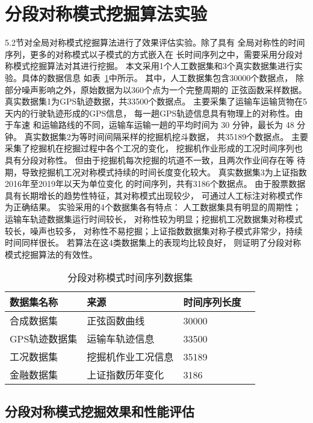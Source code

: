 \section{分段对称模式挖掘算法实验}

5.2节对全局对称模式挖掘算法进行了效果评估实验。除了具有
全局对称性的时间序列，更多的对称模式以子模式的方式嵌入在
长时间序列之中，需要采用分段对称模式挖掘算法对其进行挖掘。
本文采用1个人工数据集和3个真实数据集进行实验。具体的数据信息
如表~\ref{tab:segment_dataset}中所示。
其中，人工数据集包含30000个数据点，
除部分噪声影响之外，原始数据为以360个点为一个完整周期的
正弦函数采样数据。
真实数据集1为GPS轨迹数据，共33500个数据点。
主要采集了运输车运输货物在5天内的行驶轨迹形成的GPS信息，
每一趟GPS轨迹信息具有物理上的对称性。由于车速
和运输路线的不同，运输车运输一趟的平均时间为 30 分钟，最长为 48 分钟。
真实数据集2为等时间间隔采样的挖掘机挖斗数据，
共35189个数据点。
主要采集了挖掘机在挖掘过程中各个工况的变化，
挖掘机作业形成的工况时间序列也具有分段对称性。
但由于挖掘机每次挖掘的坑道不一致，且两次作业间存在等
待期，导致挖掘机工况对称模式持续的时间长度变化较大。
真实数据集3为上证指数2016年至2019年以天为单位变化
的时间序列，共有3186个数据点。
由于股票数据具有长期增长的趋势性特征，其对称模式出现较少，
可通过人工标注对称模式作为正确结果。
实验采用的4个数据集各有特点：
人工数据集具有明显的周期性；运输车轨迹数据集运行时间较长，
对称性较为明显；挖掘机工况数据集对称模式较长，噪声也较多，
对称性不易挖掘；上证指数数据集对称子模式非常少，持续时间同样很长。
若算法在这4类数据集上的表现均比较良好，
则证明了分段对称模式挖掘算法的有效性。

\begin{table}
  \centering
  \caption{分段对称模式时间序列数据集}
  \begin{tabular}{llll}
    \toprule
    数据集名称       & 来源                   & 时间序列长度  \\
    \midrule
    合成数据集       & 正弦函数曲线           & 30000               \\
    GPS轨迹数据集 & 运输车轨迹信息       & 33500              \\
    工况数据集 & 挖掘机作业工况信息 & 35189              \\
    金融数据集       & 上证指数历年变化       & 3186               \\
    \bottomrule
  \end{tabular}
  \label{tab:segment_dataset}
\end{table}

\subsection{分段对称模式挖掘效果和性能评估}


